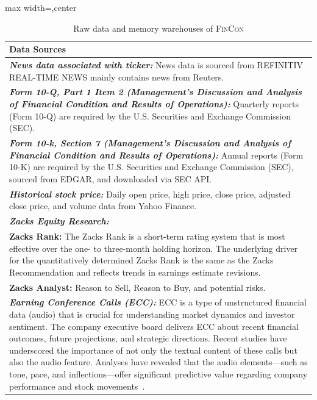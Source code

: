 \begin{table}[h]
    \centering
    \renewcommand{\arraystretch}{1.5}
    \begin{adjustbox}{max width=\dimexpr\columnwidth-0.1cm,center}
    \begin{tabular}{|m{15cm}|}
    \hline
    \textbf{Data Sources} \\ %
    \hline
    \textbf{\textit{News data associated with ticker:}} News data is sourced from REFINITIV REAL-TIME NEWS mainly contains news from Reuters.\\ 
    \hline
    
    \textbf{\textit{Form 10-Q, Part 1 Item 2 (Management’s Discussion and Analysis of Financial Condition and Results of Operations):}}  Quarterly reports (Form 10-Q) are required by the U.S. Securities and Exchange Commission (SEC). \\ 
    \hline
    
     \textbf{\textit{Form 10-k, Section 7 (Management’s Discussion and Analysis of Financial Condition and Results of Operations):}} Annual reports (Form 10-K) are required by the U.S. Securities and Exchange Commission (SEC), sourced from EDGAR, and downloaded via SEC API.  \\ 
    \hline

    \textbf{\textit{Historical stock price:}} Daily open price, high price, close price, adjusted close price, and volume data from Yahoo Finance.\\ 
    \hline

    \textbf{\textit{Zacks Equity Research:}} \\
    \textbf{Zacks Rank:} The Zacks Rank is a short-term rating system that is most effective over the one- to three-month holding horizon. The underlying driver for the quantitatively determined Zacks Rank is the same as the Zacks Recommendation and reflects trends in earnings estimate revisions.\\ 
    \textbf{Zacks Analyst:} Reason to Sell, Reason to Buy, and potential risks.\\
    \hline

    \textbf{\textit{Earning Conference Calls (ECC):}} ECC is a type of unstructured financial data (audio) that is crucial for understanding market dynamics and investor sentiment. The company executive board delivers ECC about recent financial outcomes, future projections, and strategic directions. Recent studies have underscored the importance of not only the textual content of these calls but also the audio feature. Analyses have revealed that the audio elements—such as tone, pace, and inflections—offer significant predictive value regarding company performance and stock movements~\cite{qin2019you, yang2020html, cao2024ecc}.
\\
    \hline
    
    \end{tabular}
    \end{adjustbox}
    
    \caption{Raw data and memory warehouses of \textsc{FinCon}}
    \label{tab:data_summary}
\end{table}

